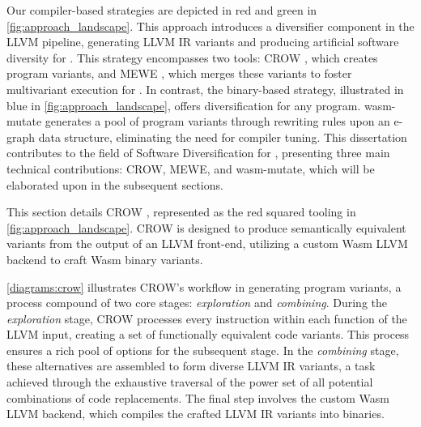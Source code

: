 Our compiler-based strategies are depicted in red and green in \autoref{fig:approach_landscape}. 
This approach introduces a diversifier component in the LLVM pipeline, generating LLVM IR variants and producing artificial software diversity for \wasm. 
This strategy encompasses two tools: CROW \cite{CROW}, which creates \wasm program variants, and MEWE \cite{MEWE}, which merges these variants to foster multivariant execution for \wasm.
In contrast, the binary-based strategy, illustrated in blue in \autoref{fig:approach_landscape}, offers diversification for any \Wasm program. 
wasm-mutate \cite{wasm-mutate} generates a pool of \Wasm program variants through rewriting rules upon an e-graph \cite{e-graph} data structure, eliminating the need for compiler tuning.
This dissertation contributes to the field of Software Diversification for \Wasm, presenting three main technical contributions: CROW, MEWE, and wasm-mutate, which will be elaborated upon in the subsequent sections.



\label{section:crow}

This section details CROW \cite{CROW}, represented as the red squared tooling in \autoref{fig:approach_landscape}. 
CROW is designed to produce semantically equivalent \wasm variants from the output of an LLVM front-end, utilizing a custom Wasm LLVM backend to craft Wasm binary variants.

\autoref{diagrams:crow} illustrates CROW's workflow in generating program variants, a process compound of two core stages: \textit{exploration} and \textit{combining}. 
During the \textit{exploration} stage, CROW processes every instruction within each function of the LLVM input, creating a set of functionally equivalent code variants. 
This process ensures a rich pool of options for the subsequent stage.
In the \textit{combining} stage, these alternatives are assembled to form diverse LLVM IR variants, a task achieved through the exhaustive traversal of the power set of all potential combinations of code replacements. 
The final step involves the custom Wasm LLVM backend, which compiles the crafted LLVM IR variants into \wasm binaries. 

